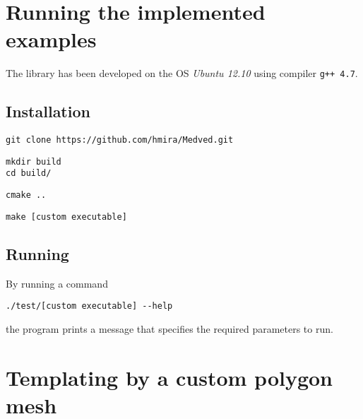 \begin{appendices}

\chapter{Running the implemented examples}

The library has been developed on the OS \emph{Ubuntu 12.10} using compiler \texttt{g++ 4.7}.



\section{Installation}

\begin{lstlisting}
git clone https://github.com/hmira/Medved.git
\end{lstlisting}

\begin{lstlisting}
mkdir build
cd build/
\end{lstlisting}

\begin{lstlisting}
cmake ..
\end{lstlisting}

\begin{lstlisting}
make [custom executable]
\end{lstlisting}

\section{Running}

By running a command

\begin{lstlisting}
./test/[custom executable] --help
\end{lstlisting}
the program prints a message that specifies the required parameters to run.

\chapter{Templating by a custom polygon mesh}


\end{appendices}
